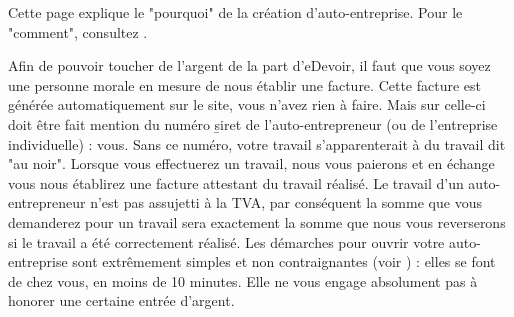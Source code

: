 ﻿Cette page explique le "pourquoi" de la création d'auto-entreprise. Pour le "comment", consultez .

Afin de pouvoir toucher de l'argent de la part d'eDevoir, il faut que vous soyez une personne morale en mesure de nous établir une facture. Cette facture est générée automatiquement sur le site, vous n'avez rien à faire. Mais sur celle-ci doit être fait mention du numéro \b{siret} de l'auto-entrepreneur (ou de l'entreprise individuelle) : vous. Sans ce numéro, votre travail s'apparenterait à du travail dit "au noir". Lorsque vous effectuerez un travail, nous vous paierons et en échange vous nous établirez une facture attestant du travail réalisé. Le travail d'un auto-entrepreneur n'est pas assujetti à la TVA, par conséquent la somme que vous demanderez pour un travail sera exactement la somme que nous vous reverserons si le travail a été correctement réalisé.
Les démarches pour ouvrir votre auto-entreprise sont extrêmement simples et non contraignantes (voir ) : elles se font de chez vous, en moins de 10 minutes. Elle ne vous engage absolument pas à honorer une certaine entrée d'argent.